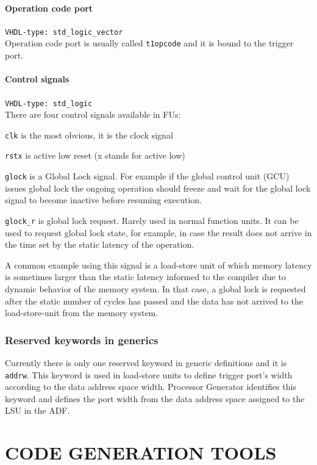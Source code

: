 \documentclass[twoside]{tceusermanual}
\begin{document}
\subsubsection{Operation code port}
\verb|VHDL-type: std_logic_vector| \\
Operation code port is usually called \verb|t1opcode| and it is bound to the
trigger port.

\subsubsection{Control signals}
\verb|VHDL-type: std_logic| \\
There are four control signals available in FUs:

\verb|clk| is the most obvious, it is the clock signal

\verb|rstx| is active low reset (x stands for active low)

\verb|glock| is a Global Lock signal. For example if the global control unit
(GCU) issues global lock the ongoing operation should freeze and wait for
the global lock signal to become inactive before resuming execution.

\verb|glock_r| is global lock request. Rarely used in normal function units.
It can be used to request global lock state, for example, in case the
result does not arrive in the time set by the static latency of the
operation. 

A common example using this signal is a load-store unit of which
memory latency is sometimes larger than the static latency informed to the
compiler due to dynamic behavior of the memory system. In that case, a
global lock is requested after the static number of cycles has passed and
the data has not arrived to the load-store-unit from the memory system.

\subsection{Reserved keywords in generics}

Currently there is only one reserved keyword in generic definitions and it is
\verb|addrw|. This keyword is used in load-store units to define trigger
port's width according to the data address space width. Processor Generator
identifies this keyword and defines the port width from the data address space
assigned to the LSU in the ADF.


\chapter{CODE GENERATION TOOLS}
\end{document}
